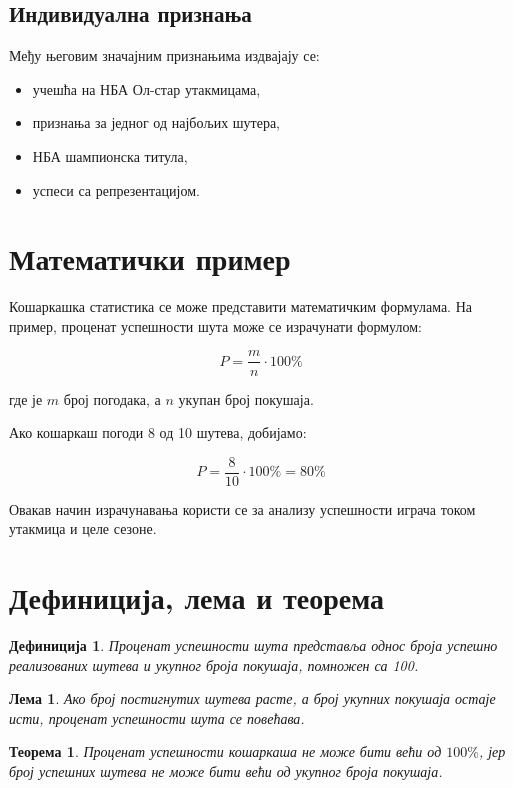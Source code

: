 \documentclass[a4paper]{article}
\newtheorem{definicija}{Дефиниција}
\newtheorem{teorema}{Теорема}
\newtheorem{lema}{Лема}
\begin{document}
\subsection{Индивидуална признања}

Међу његовим значајним признањима издвајају се:

\begin{itemize}
    \item учешћа на НБА Ол-стар утакмицама,
    \item признања за једног од најбољих шутера,
    \item НБА шампионска титула,
    \item успеси са репрезентацијом.
\end{itemize}

\section{Математички пример}

Кошаркашка статистика се може представити математичким
формулама. На пример, проценат успешности шута може се
израчунати формулом:

\[
P = \frac{m}{n} \cdot 100\%
\]

где је $m$ број погодака, а $n$ укупан број покушаја.

Ако кошаркаш погоди 8 од 10 шутева, добијамо:

\[
P = \frac{8}{10} \cdot 100\% = 80\%
\]

Овакав начин израчунавања користи се за анализу успешности
играча током утакмица и целе сезоне.

\section{Дефиниција, лема и теорема}

\begin{definicija}
Проценат успешности шута представља однос броја успешно
реализованих шутева и укупног броја покушаја, помножен са 100.
\end{definicija}

\begin{lema}
Ако број постигнутих шутева расте, а број укупних покушаја
остаје исти, проценат успешности шута се повећава.
\end{lema}

\begin{teorema}
Проценат успешности кошаркаша не може бити већи од $100\%$,
јер број успешних шутева не може бити већи од укупног броја
покушаја.
\end{teorema}
\end{document}
